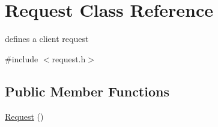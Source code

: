 \hypertarget{classRequest}{}\section{Request Class Reference}
\label{classRequest}


defines a client request  




{\ttfamily \#include $<$request.\+h$>$}

\subsection*{Public Member Functions}
\begin{DoxyCompactItemize}
\item 
\hyperlink{classRequest_afaf8d8928de7ffff8a3767589489bd33}{Request} ()\hypertarget{classRequest_afaf8d8928de7ffff8a3767589489bd33}{}\label{classRequest_afaf8d8928de7ffff8a3767589489bd33}


\end{DoxyCompactItemize}
